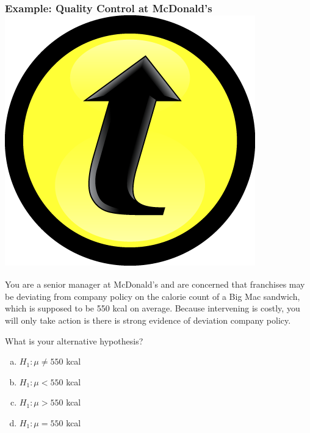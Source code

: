 \documentclass[handout]{beamer}
\begin{document}
\begin{frame}
\frametitle{Example: Quality Control at McDonald's \hfill \includegraphics[scale = 0.05]{./images/clicker}}

You are a senior manager at McDonald's and are concerned that franchises may be deviating from company policy on the calorie count of a Big Mac sandwich, which is supposed to be 550 kcal on average. Because intervening is costly, you will only take action is there is strong evidence of deviation company policy. \\

\vspace{1em}

\alert{What is your alternative hypothesis?}
	\begin{enumerate}[(a)]
		\item $H_1\colon \mu \neq 550$ kcal
		\item $H_1\colon \mu < 550$ kcal
		\item $H_1\colon \mu > 550$ kcal
		\item $H_1\colon \mu = 550$ kcal
\end{enumerate}
\end{frame}
\end{document}
